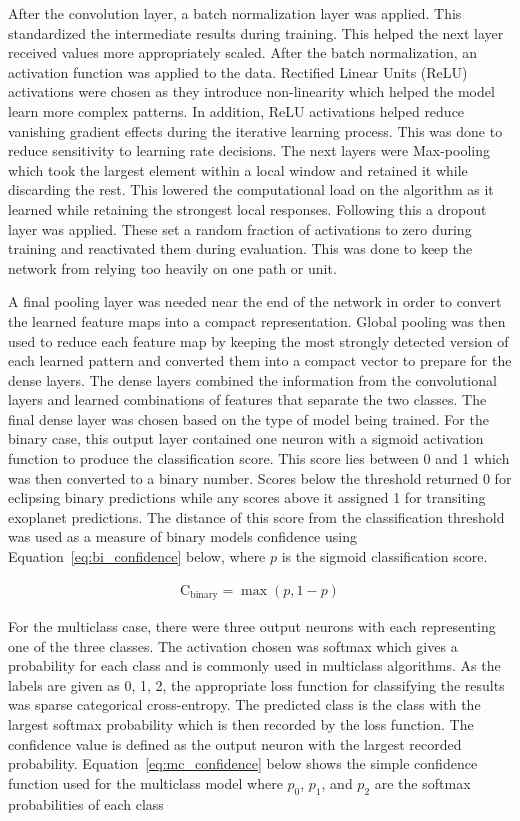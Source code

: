 After the convolution layer, a batch normalization layer was applied. This standardized the intermediate results during training. This helped the next layer received values more appropriately scaled. After the batch normalization, an activation function was applied to the data. Rectified Linear Units (ReLU) activations were chosen as they introduce non-linearity which helped the model learn more complex patterns. In addition, ReLU activations helped reduce vanishing gradient effects during the iterative learning process. This was done to reduce sensitivity to learning rate decisions. The next layers were Max-pooling which took the largest element within a local window and retained it while discarding the rest. This lowered the computational load on the algorithm as it learned while retaining the strongest local responses. Following this a dropout layer was applied. These set a random fraction of activations to zero during training and reactivated them during evaluation. This was done to keep the network from relying too heavily on one path or unit. 

A final pooling layer was needed near the end of the network in order to convert the learned feature maps into a compact representation. Global pooling was then used to reduce each feature map by keeping the most strongly detected version of each learned pattern and converted them into a compact vector to prepare for the dense layers. The dense layers combined the information from the convolutional layers and learned combinations of features that separate the two classes. The final dense layer was chosen based on the type of model being trained. For the binary case, this output layer contained one neuron with a sigmoid activation function to produce the classification score. This score lies between 0 and 1 which was then converted to a binary number. Scores below the threshold returned 0 for eclipsing binary predictions while any scores above it assigned 1 for transiting exoplanet predictions. The distance of this score from the classification threshold was used as a measure of binary models confidence using Equation~\ref{eq:bi_confidence} below, where $p$ is the sigmoid classification score. 

\begin{align}
     \text{C}_{\text{binary}} = \max{(p, 1-p)}\label{eq:bi_confidence}
\end{align}

For the multiclass case, there were three output neurons with each representing one of the three classes. The activation chosen was softmax which gives a probability for each class and is commonly used in multiclass algorithms. As the labels are given as 0, 1, 2, the appropriate loss function for classifying the results was sparse categorical cross-entropy. The predicted class is the class with the largest softmax probability which is then recorded by the loss function. The confidence value is defined as the output neuron with the largest recorded probability. Equation~\ref{eq:mc_confidence} below shows the simple confidence function used for the multiclass model where $p_0$, $p_1$, and $p_2$ are the softmax probabilities of each class

